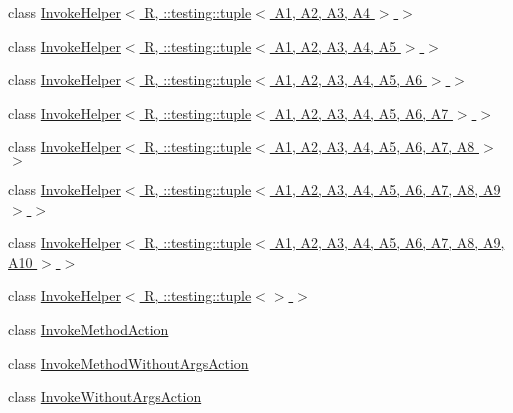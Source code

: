 \begin{DoxyCompactItemize}
\item 
class \hyperlink{classtesting_1_1internal_1_1_invoke_helper_3_01_r_00_01_1_1testing_1_1tuple_3_01_a1_00_01_a2_00_01_a3_00_01_a4_01_4_01_4}{Invoke\+Helper$<$ R, \+::testing\+::tuple$<$ A1, A2, A3, A4 $>$ $>$}
\item 
class \hyperlink{classtesting_1_1internal_1_1_invoke_helper_3_01_r_00_01_1_1testing_1_1tuple_3_01_a1_00_01_a2_00_5dd6c0827e45a39a81d93a14211e2a19}{Invoke\+Helper$<$ R, \+::testing\+::tuple$<$ A1, A2, A3, A4, A5 $>$ $>$}
\item 
class \hyperlink{classtesting_1_1internal_1_1_invoke_helper_3_01_r_00_01_1_1testing_1_1tuple_3_01_a1_00_01_a2_00_5653fefa261cff106ebaaf9c78f6ee42}{Invoke\+Helper$<$ R, \+::testing\+::tuple$<$ A1, A2, A3, A4, A5, A6 $>$ $>$}
\item 
class \hyperlink{classtesting_1_1internal_1_1_invoke_helper_3_01_r_00_01_1_1testing_1_1tuple_3_01_a1_00_01_a2_00_9169216bddd5005837acd145af38ec6f}{Invoke\+Helper$<$ R, \+::testing\+::tuple$<$ A1, A2, A3, A4, A5, A6, A7 $>$ $>$}
\item 
class \hyperlink{classtesting_1_1internal_1_1_invoke_helper_3_01_r_00_01_1_1testing_1_1tuple_3_01_a1_00_01_a2_00_c90976166c933075c49792215d8203bb}{Invoke\+Helper$<$ R, \+::testing\+::tuple$<$ A1, A2, A3, A4, A5, A6, A7, A8 $>$ $>$}
\item 
class \hyperlink{classtesting_1_1internal_1_1_invoke_helper_3_01_r_00_01_1_1testing_1_1tuple_3_01_a1_00_01_a2_00_cb3e0694d0722fcc616ae618dc383e5b}{Invoke\+Helper$<$ R, \+::testing\+::tuple$<$ A1, A2, A3, A4, A5, A6, A7, A8, A9 $>$ $>$}
\item 
class \hyperlink{classtesting_1_1internal_1_1_invoke_helper_3_01_r_00_01_1_1testing_1_1tuple_3_01_a1_00_01_a2_00_d7025e877e4f690a17d0a7f1e26fac53}{Invoke\+Helper$<$ R, \+::testing\+::tuple$<$ A1, A2, A3, A4, A5, A6, A7, A8, A9, A10 $>$ $>$}
\item 
class \hyperlink{classtesting_1_1internal_1_1_invoke_helper_3_01_r_00_01_1_1testing_1_1tuple_3_4_01_4}{Invoke\+Helper$<$ R, \+::testing\+::tuple$<$$>$ $>$}
\item 
class \hyperlink{classtesting_1_1internal_1_1_invoke_method_action}{Invoke\+Method\+Action}
\item 
class \hyperlink{classtesting_1_1internal_1_1_invoke_method_without_args_action}{Invoke\+Method\+Without\+Args\+Action}
\item 
class \hyperlink{classtesting_1_1internal_1_1_invoke_without_args_action}{Invoke\+Without\+Args\+Action}
\item 

\end{DoxyCompactItemize}

